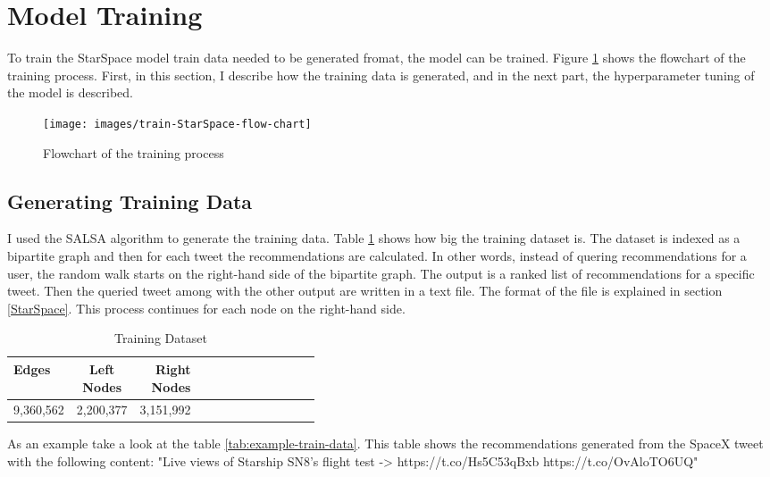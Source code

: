 \section{Model Training}
\label{Model Training}
To train the StarSpace model train data needed to be generated fromat, the model can be trained. Figure \ref{fig:star-space-training} shows the flowchart of the training process. First, in this section, I describe how the training data is generated, and in the next part, the hyperparameter tuning of the model is described.

\begin{figure}[!h]
	\centering
	\texttt{[image: images/train-StarSpace-flow-chart]}
	\caption{Flowchart of the training process}
	\label{fig:star-space-training}
\end{figure}

\subsection{Generating Training Data}
\label{Generating Training Data}
I used the SALSA algorithm to generate the training data. Table \ref{tab:train-data} shows how big the training dataset is. The dataset is indexed as a bipartite graph and then for each tweet the recommendations are calculated. In other words, instead of quering recommendations for a user, the random walk starts on the right-hand side of the bipartite graph. The output is a ranked list of recommendations for a specific tweet. Then the queried tweet among with the other output are written in a text file. The format of the file is explained in section \ref{StarSpace}. This process continues for each node on the right-hand side.

\begin{table}[!ht]
	\centering
	\caption{Training Dataset}
	\label{tab:train-data}
	\begin{tabular}{|l|c|r|m{0.4\linewidth}|}
		\hline
		\textbf{Edges} & \textbf{Left Nodes} & \textbf{Right Nodes} \\
		\hline
		9,360,562 & 2,200,377 & 3,151,992	\\
		\hline
	\end{tabular}
\end{table}

As an example take a look at the table \ref{tab:example-train-data}. This table shows the recommendations generated from the SpaceX tweet with the following content: "Live views of Starship SN8’s flight test -> https://t.co/Hs5C53qBxb https://t.co/OvAloTO6UQ"

